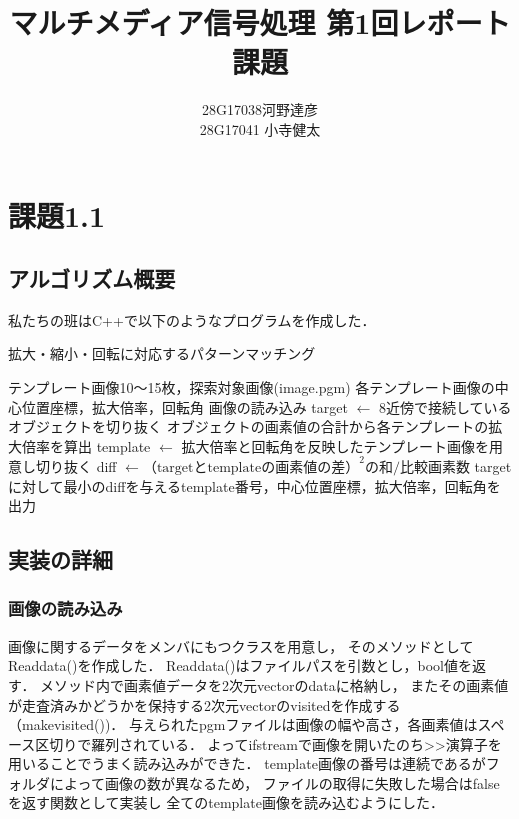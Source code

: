 \documentclass[platex,dvipdfmx]{jsarticle}
\title{マルチメディア信号処理 第1回レポート課題}
\author{28G17038河野達彦\\28G17041 小寺健太}
\begin{document}
  
\maketitle

\section{課題1.1}
\subsection{アルゴリズム概要}
私たちの班はC++で以下のようなプログラムを作成した．

\begin{algorithm}                      
\caption{拡大・縮小・回転に対応するパターンマッチング}         
\label{alg1}                          
\begin{algorithmic}                  
\REQUIRE テンプレート画像10〜15枚，探索対象画像(image.pgm)
\ENSURE 各テンプレート画像の中心位置座標，拡大倍率，回転角
\STATE 画像の読み込み
    \STATE target $\leftarrow$ 8近傍で接続しているオブジェクトを切り抜く
      \STATE オブジェクトの画素値の合計から各テンプレートの拡大倍率を算出
        \STATE template $\leftarrow$ 拡大倍率と回転角を反映したテンプレート画像を用意し切り抜く
        \STATE diff $\leftarrow （\mbox{target}と\mbox{template}の画素値の差）^2 の和 / 比較画素数$
      \ENDFOR
    \ENDFOR
    \STATE targetに対して最小のdiffを与えるtemplate番号，中心位置座標，拡大倍率，回転角を出力
  \ENDIF
\ENDFOR
\end{algorithmic}
\end{algorithm}

\subsection{実装の詳細}
\subsubsection{画像の読み込み}
画像に関するデータをメンバにもつクラスを用意し，
そのメソッドとしてReaddata()を作成した．
Readdata()はファイルパスを引数とし，bool値を返す．
メソッド内で画素値データを2次元vectorのdataに格納し，
またその画素値が走査済みかどうかを保持する2次元vectorのvisitedを作成する（makevisited())．
与えられたpgmファイルは画像の幅や高さ，各画素値はスペース区切りで羅列されている．
よってifstreamで画像を開いたのち>>演算子を用いることでうまく読み込みができた．
template画像の番号は連続であるがフォルダによって画像の数が異なるため，
ファイルの取得に失敗した場合はfalseを返す関数として実装し
全てのtemplate画像を読み込むようにした．\\
\end{document}
